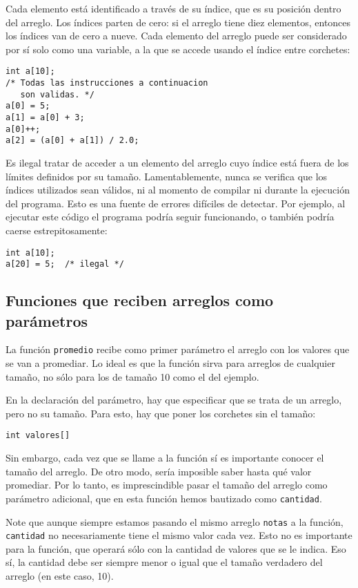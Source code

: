 Cada elemento está identificado a través de su índice, que es su
posición dentro del arreglo. Los índices parten de cero: si el arreglo
tiene diez elementos, entonces los índices van de cero a nueve. Cada
elemento del arreglo puede ser considerado por sí solo como una
variable, a la que se accede usando el índice entre corchetes:

\begin{lstlisting}
int a[10];
/* Todas las instrucciones a continuacion
   son validas. */
a[0] = 5;
a[1] = a[0] + 3;
a[0]++;
a[2] = (a[0] + a[1]) / 2.0;
\end{lstlisting}

Es ilegal tratar de acceder a un elemento del arreglo cuyo índice está
fuera de los límites definidos por su tamaño. Lamentablemente, nunca se
verifica que los índices utilizados sean válidos, ni al momento de
compilar ni durante la ejecución del programa. Esto es una fuente de
errores difíciles de detectar. Por ejemplo, al ejecutar este código el
programa podría seguir funcionando, o también podría caerse
estrepitosamente:

\begin{lstlisting}
int a[10];
a[20] = 5;  /* ilegal */
\end{lstlisting}

\subsection{Funciones que reciben arreglos como parámetros}

La función \lstinline!promedio! recibe como primer parámetro el arreglo
con los valores que se van a promediar. Lo ideal es que la función sirva
para arreglos de cualquier tamaño, no sólo para los de tamaño 10 como el
del ejemplo.

En la declaración del parámetro, hay que especificar que se trata de un
arreglo, pero no su tamaño. Para esto, hay que poner los corchetes sin
el tamaño:

\begin{lstlisting}
int valores[]
\end{lstlisting}

Sin embargo, cada vez que se llame a la función sí es importante conocer
el tamaño del arreglo. De otro modo, sería imposible saber hasta qué
valor promediar. Por lo tanto, es imprescindible pasar el tamaño del
arreglo como parámetro adicional, que en esta función hemos bautizado
como \lstinline!cantidad!.

Note que aunque siempre estamos pasando el mismo arreglo
\lstinline!notas! a la función, \lstinline!cantidad! no necesariamente
tiene el mismo valor cada vez. Esto no es importante para la función,
que operará sólo con la cantidad de valores que se le indica. Eso sí, la
cantidad debe ser siempre menor o igual que el tamaño verdadero del
arreglo (en este caso, 10).

